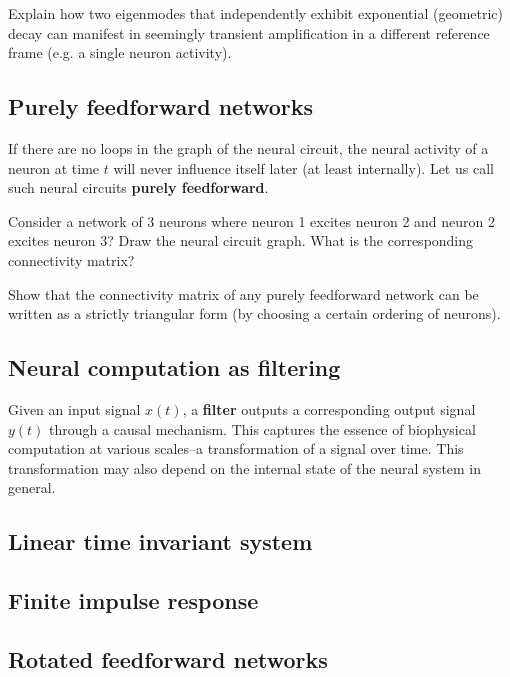 \documentclass[a4paper,11pt]{exam}
\newcounter{ct}
\begin{document}
\begin{questions}
\question Explain how two eigenmodes that independently exhibit exponential (geometric) decay can manifest in seemingly transient amplification in a different reference frame (e.g. a single neuron activity).

\subsection{Purely feedforward networks}
If there are no loops in the graph of the neural circuit, the neural activity of a neuron at time $t$ will never influence itself later (at least internally).
Let us call such neural circuits \textbf{purely feedforward}.

\question Consider a network of 3 neurons where neuron 1 excites neuron 2 and neuron 2 excites neuron 3? Draw the neural circuit graph.
What is the corresponding connectivity matrix?

\question Show that the connectivity matrix of any purely feedforward network can be written as a strictly triangular form (by choosing a certain ordering of neurons).


\subsection{Neural computation as filtering}
Given an input signal $x(t)$, a \textbf{filter} outputs a corresponding output signal $y(t)$ through a causal mechanism.
This captures the essence of biophysical computation at various scales--a transformation of a signal over time.
This transformation may also depend on the internal state of the neural system in general.

\subsection{Linear time invariant system}

\subsection{Finite impulse response}

\subsection{Rotated feedforward networks}



\end{questions}
\end{document}
